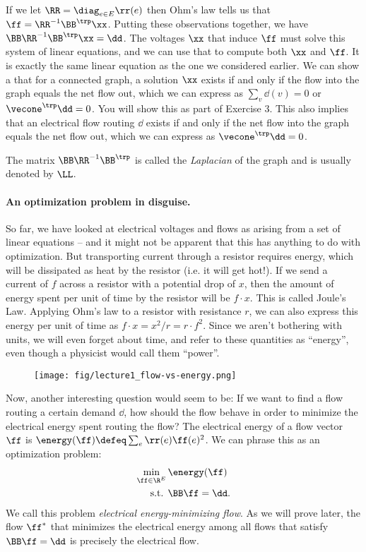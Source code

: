 If we let $\RR = \diag_{e \in E} \rr(e)$
then Ohm's law tells us that $\ff = \RR^{-1}\BB^{\trp} \xx$.
Putting these observations together, we have $\BB \RR^{-1}\BB^{\trp}
\xx= \dd$.
The voltages $\xx$ that induce $\ff$ must solve this system of linear
equations, and we can use that to compute both $\xx$ and $\ff$.
It is exactly the same linear
equation as the one we considered earlier.
We can show a that for a connected graph, a solution $\xx$
exists if and only if the
flow into the graph equals the net flow out, which we can express as
$\sum_{v} \dd(v) = 0$ or $\vecone^\trp \dd = 0$.
You will show this as part of Exercise 3.
This also implies that an electrical flow routing
$\dd$ exists if and only if the net
flow into the graph equals the net flow out, which we can express as
$\vecone^\trp \dd = 0$.


The matrix $\BB \RR^{-1}\BB^{\trp}$ is called the \emph{Laplacian} of
the graph and is usually denoted by $\LL$.

\paragraph{An optimization problem in disguise.}
So far, we have looked at electrical voltages and flows as arising
from a set of linear equations -- and it might not be apparent that
this has anything to do with optimization.
But transporting current through a resistor requires energy, which will be
dissipated as heat by the resistor (i.e. it will get hot!).
If we send a current of $f$ across a resistor with a potential drop of
$x$, then the amount of energy spent per unit of time by the resistor will be
$f \cdot x$. This is called Joule's Law.
Applying Ohm's law to a resistor with resistance $r$,
we can also express this energy per unit of time
as $f \cdot x = x^2 / r = r \cdot f ^2$.
Since we aren't bothering with units, we will even forget about time,
and refer to these quantities as ``energy'', even though a physicist
would call them ``power''.

\begin{figure}[H]
  \centering
  \texttt{[image: fig/lecture1\_flow-vs-energy.png]}
  \label{fig:flow-vs-energy}
\end{figure}

Now, another interesting question would seem to be: If we want to find
a flow routing a certain demand $\dd$, how should the flow behave in
order to minimize the electrical energy spent routing the flow?
The electrical energy of a flow vector $\ff$ is $\energy(\ff) \defeq \sum_e \rr(e) \ff(e)^2$.
We can phrase this as an optimization problem:
\begin{align*}
  \min_{\ff \in \R^E} \, & \energy(\ff)
  \\
  \textrm{s.t. } & \BB \ff = \dd .
\end{align*}
We call this problem \emph{electrical energy-minimizing flow}.
As we will prove later, the flow $\ff^*$ that minimizes the electrical
energy among all flows that satisfy $\BB \ff = \dd$ is precisely the
electrical flow.

